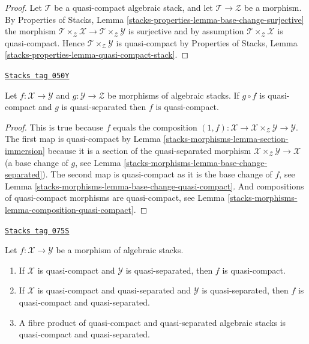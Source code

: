 \begin{proof}
Let $\mathcal{T}$ be a quasi-compact algebraic stack, and let
$\mathcal{T} \to \mathcal{Z}$ be a morphism. By
Properties of Stacks,
Lemma \ref{stacks-properties-lemma-base-change-surjective}
the morphism
$\mathcal{T} \times_\mathcal{Z} \mathcal{X} \to
\mathcal{T} \times_\mathcal{Z} \mathcal{Y}$
is surjective and by assumption
$\mathcal{T} \times_\mathcal{Z} \mathcal{X}$
is quasi-compact. Hence
$\mathcal{T} \times_\mathcal{Z} \mathcal{Y}$
is quasi-compact by
Properties of Stacks, Lemma \ref{stacks-properties-lemma-quasi-compact-stack}.
\end{proof}

\begin{lemma}
\label{stacks-morphisms-lemma-quasi-compact-permanence}
\href{https://stacks.math.columbia.edu/tag/050Y}{\texttt{Stacks tag 050Y}}

Let $f : \mathcal{X} \to \mathcal{Y}$ and
$g : \mathcal{Y} \to \mathcal{Z}$ be morphisms of algebraic stacks.
If $g \circ f$ is quasi-compact and $g$ is quasi-separated
then $f$ is quasi-compact.
\end{lemma}

\begin{proof}
This is true because $f$ equals the composition
$(1, f) : \mathcal{X} \to \mathcal{X} \times_\mathcal{Z} \mathcal{Y} \to
\mathcal{Y}$.
The first map is quasi-compact by
Lemma \ref{stacks-morphisms-lemma-section-immersion}
because it is a section of the quasi-separated morphism
$\mathcal{X} \times_\mathcal{Z} \mathcal{Y} \to \mathcal{X}$
(a base change of $g$, see
Lemma \ref{stacks-morphisms-lemma-base-change-separated}).
The second map is quasi-compact as it is the base change of $f$, see
Lemma \ref{stacks-morphisms-lemma-base-change-quasi-compact}.
And compositions of quasi-compact
morphisms are quasi-compact, see Lemma \ref{stacks-morphisms-lemma-composition-quasi-compact}.
\end{proof}

\begin{lemma}
\label{stacks-morphisms-lemma-quasi-compact-quasi-separated-permanence}
\href{https://stacks.math.columbia.edu/tag/075S}{\texttt{Stacks tag 075S}}

Let $f : \mathcal{X} \to \mathcal{Y}$ be a morphism of algebraic stacks.
\begin{enumerate}
\item If $\mathcal{X}$ is quasi-compact and $\mathcal{Y}$ is
quasi-separated, then $f$ is quasi-compact.
\item If $\mathcal{X}$ is quasi-compact and quasi-separated and $\mathcal{Y}$
is quasi-separated, then $f$ is quasi-compact and quasi-separated.
\item A fibre product of quasi-compact and quasi-separated algebraic stacks
is quasi-compact and quasi-separated.
\end{enumerate}
\end{lemma}

